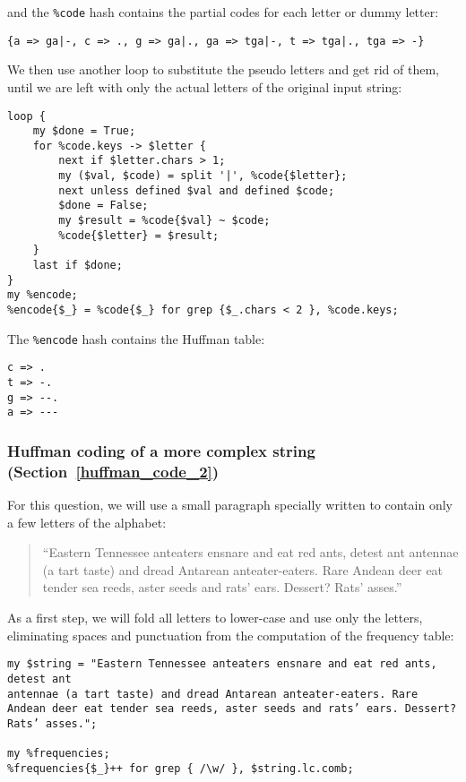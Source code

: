 and the \verb'%code' hash contains the partial codes for each 
letter or dummy letter:

\begin{verbatim}
{a => ga|-, c => ., g => ga|., ga => tga|-, t => tga|., tga => -}
\end{verbatim}

We then use another loop to substitute the pseudo letters and get 
rid of them, until we are left with only the actual letters of the 
original input string:

\begin{verbatim}
loop {   
    my $done = True;
    for %code.keys -> $letter {
        next if $letter.chars > 1;
        my ($val, $code) = split '|', %code{$letter};
        next unless defined $val and defined $code;
        $done = False;
        my $result = %code{$val} ~ $code;
        %code{$letter} = $result;
    }
    last if $done;
}
my %encode;
%encode{$_} = %code{$_} for grep {$_.chars < 2 }, %code.keys;
\end{verbatim}

The \verb'%encode' hash contains the Huffman table:

\begin{verbatim}
c => .
t => -.
g => --.
a => ---
\end{verbatim}

\subsubsection{Huffman coding of a more complex string (Section~\ref{huffman_code_2})}

For this question, we will use a small paragraph specially written 
to contain only a few letters of the alphabet:

\begin{quote}
``Eastern Tennessee anteaters ensnare and eat red ants, detest ant
antennae (a tart taste) and dread Antarean anteater-eaters. Rare
Andean deer eat tender sea reeds, aster seeds and rats’ ears. Dessert?
Rats’ asses.''
\end{quote}

As a first step, we will fold all letters to lower-case and use 
only the letters, eliminating spaces and punctuation from 
the computation of the frequency table:

\begin{verbatim}
my $string = "Eastern Tennessee anteaters ensnare and eat red ants, detest ant
antennae (a tart taste) and dread Antarean anteater-eaters. Rare
Andean deer eat tender sea reeds, aster seeds and rats’ ears. Dessert?
Rats’ asses."; 

my %frequencies;
%frequencies{$_}++ for grep { /\w/ }, $string.lc.comb;
\end{verbatim}

